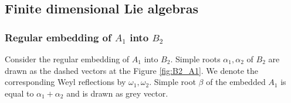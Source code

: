 \documentclass[a4paper,12pt]{article}
\theoremstyle{definition} \newtheorem{Def}{Definition}
\begin{document}
\subsection{Finite dimensional Lie algebras}
\label{sec:finite-dimens-lie}

\subsubsection{Regular embedding of $A_1$ into $B_2$}
\label{sec:regul-embedd-a_1}

Consider the regular embedding of $A_1$ into $B_2$. Simple roots $\alpha_1, \alpha_2$ of $B_2$ are drawn as the dashed vectors at the Figure \ref{fig:B2_A1}. We denote the corresponding Weyl reflections by $\omega_1, \omega_2$. Simple root $\beta$ of the embedded $A_1$ is equal to $\alpha_1+\alpha_2$ and is drawn as grey vector.
\end{document}

